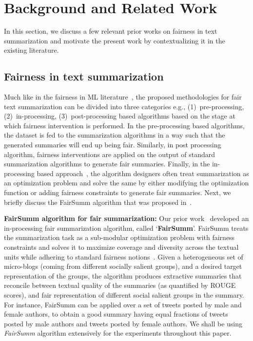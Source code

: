 \section{Background and Related Work}
\noindent
In this section, we %
discuss a few relevant prior works on fairness in text summarization and motivate the present work by contextualizing it in the existing literature.  

\subsection{Fairness in text summarization}
\noindent
Much like in the fairness in ML literature~\cite{ali2019fairness,friedler2019comparative,patro2020fairrec}, the proposed methodologies for fair text summarization can be divided into three categories e.g., (1)~pre-processing, (2)~in-processing, (3)~post-processing based algorithms based on the stage at which fairness intervention is performed. 
In the pre-processing based algorithms, the dataset is fed to the summarization algorithms in a way such that the generated summaries will end up being fair. Similarly, in post processing algorithm, fairness interventions are applied on the output of standard summarization algorithms to generate fair summaries. 
Finally, in the in-processing based approach~\cite{dash2019summarizing, mukherjee2020read}, the algorithm designers often treat summarization as an optimization problem and solve the same by either modifying the optimization function or adding fairness constraints to generate fair summaries. Next, we briefly discuss the FairSumm algorithm that was proposed in~\cite{dash2019summarizing}.

\vspace{2 mm}
\noindent \textbf{FairSumm algorithm for fair summarization:} Our prior work~\cite{dash2019summarizing} developed an in-processing fair summarization algorithm, called `\textbf{FairSumm}'. %
FairSumm treats the summarization task as a sub-modular optimization problem with fairness constraints and solves it to maximize coverage and diversity across the textual units while adhering to standard fairness notions~\cite{dash2019summarizing}. Given a heterogeneous set of micro-blogs (coming from different socially salient groups), and a desired target representation of the groups, the algorithm produces extractive summaries that reconcile between textual quality of the summaries (as quantified by ROUGE scores), and fair representation of different social salient groups in the summary. 
For instance, FairSumm can be applied over a set of tweets posted by male and female authors, to obtain a good summary having equal fractions of tweets posted by male authors and tweets posted by female authors.
We shall be using \textit{FairSumm} algorithm extensively for the experiments throughout this paper.

